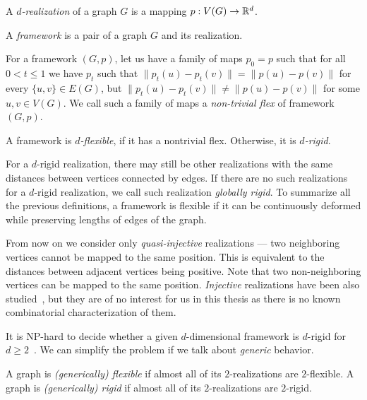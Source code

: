 %
\begin{definition}[\( d \)-realization]
	A \emph{\( d \)-realization} of a graph \( G \) is a mapping \( p: V(G) \to \mathbb{R}^d \).
\end{definition}
%
\begin{definition}[Framework]
	A \emph{framework} is a pair of a graph \( G \) and its realization.
\end{definition}
%
\begin{definition}
	For a framework \( (G, p) \),
	let us have a family of maps \( p_0 = p \) such that for all \( 0 < t \le 1 \)
	we have \( p_t \) such that
	\( \|p_t(u) - p_t(v)\| = \|p(u) - p(v)\|\) for every \( \{u, v\} \in E(G) \),
	but \( \|p_t(u) - p_t(v)\| \ne \|p(u) - p(v)\| \) for some \( u, v \in V (G) \).
	We call such a family of maps a \emph{non-trivial flex} of framework \( (G, p) \).
\end{definition}
%
\begin{definition}
	A framework is \emph{\( d \)-flexible}, if it has a nontrivial flex.
	Otherwise, it is \emph{\( d \)-rigid}.
\end{definition}
%
For a \( d \)-rigid realization, there may still be other realizations
with the same distances between vertices connected by edges.
If there are no such realizations for a \( d \)-rigid realization,
we call such realization \emph{globally rigid}.
To summarize all the previous definitions,
a framework is flexible if it can be continuously deformed
while preserving lengths of edges of the graph.

From now on we consider only \emph{quasi-injective} realizations ---
two neighboring vertices cannot be mapped to the same position.
This is equivalent to the distances between adjacent vertices being positive.
Note that two non-neighboring vertices can be mapped to the same position.
\emph{Injective} realizations have been also studied~\cite{injective_realizations},
but they are of no interest for us in this thesis
as there is no known combinatorial characterization of them.

It is NP-hard to decide whether a given \( d \)-dimensional framework is
\( d \)-rigid for \( d \ge 2 \)~\cite{d_rigidity_hardness}.
We can simplify the problem if we talk about \emph{generic}
behavior.
%
\begin{definition}
	A graph is \emph{(generically) flexible} if almost all of
	its \( 2 \)-realizations are \( 2 \)-flexible.
	A graph is \emph{(generically) rigid} if almost all of
	its \( 2 \)-realizations are \( 2 \)-rigid.
\end{definition}
%

